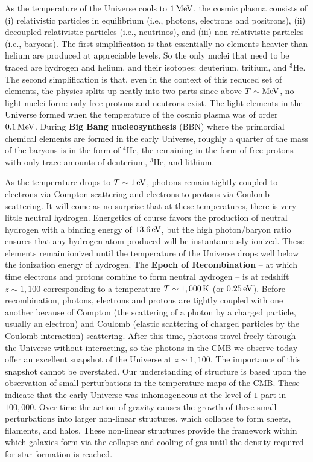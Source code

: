 \documentclass[a4paper,11pt]{article}
\begin{document}
As the temperature of the Universe cools to $1\,{\rm MeV}$, the cosmic plasma consists of (i) relativistic particles in equilibrium (i.e., photons, electrons and positrons), (ii) decoupled relativistic particles (i.e., neutrinos), and (iii) non-relativistic particles (i.e., baryons). The first simplification is that essentially no elements heavier than helium are produced at appreciable levels. So the only nuclei that need to be traced are hydrogen and helium, and their isotopes: deuterium, tritium, and $^3$He. The second simplification is that, even in the context of this reduced set of elements, the physics splits up neatly into two parts since above $T\sim\rm{MeV}$, no light nuclei form: only free protons and neutrons exist. The light elements in the Universe formed when the temperature of the cosmic plasma was of order $0.1\,{\rm MeV}$. During \textbf{Big Bang nucleosynthesis} (BBN) where the primordial chemical elements are formed in the early Universe, roughly a quarter of the mass of the baryons is in the form of $^4$He, the remaining in the form of free protons with only trace amounts of deuterium, $^3$He, and lithium.

As the temperature drops to $T\sim1\,{\rm eV}$, photons remain tightly coupled to electrons via Compton scattering and electrons to protons via Coulomb scattering. It will come as no surprise that at these temperatures, there is very little neutral hydrogen. Energetics of course favors the production of neutral hydrogen with a binding energy of $13.6\,{\rm eV}$, but the high photon/baryon ratio ensures that any hydrogen atom produced will be instantaneously ionized. These elements remain ionized until the temperature of the Universe drops well below the ionization energy of hydrogen. The \textbf{Epoch of Recombination} -- at which time electrons and protons combine to form neutral hydrogen -- is at redshift $z\sim1,100$ corresponding to a temperature $T\sim1,000\,{\rm K}$ (or $0.25\,{\rm eV}$). Before recombination, photons, electrons and protons are tightly coupled with one another because of Compton (the scattering of a photon by a charged particle, usually an electron) and Coulomb (elastic scattering of charged particles by the Coulomb interaction) scattering. After this time, photons travel freely through the Universe without interacting, so the photons in the CMB we observe today offer an excellent snapshot of the Universe at $z\sim1,100$. The importance of this snapshot cannot be overstated. Our understanding of structure is based upon the observation of small perturbations in the temperature maps of the CMB. These indicate that the early Universe was inhomogeneous at the level of $1$ part in $100,000$. Over time the action of gravity causes the growth of these small perturbations into larger non-linear structures, which collapse to form sheets, filaments, and halos. These non-linear structures provide the framework within which galaxies form via the collapse and cooling of gas until the density required for star formation is reached.
\end{document}
